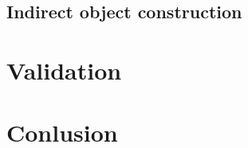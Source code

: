 \subsection{Indirect object construction}

\label{sec:graphfactory}
\label{sec:modports}

\section{Validation}

\section{Conlusion}

